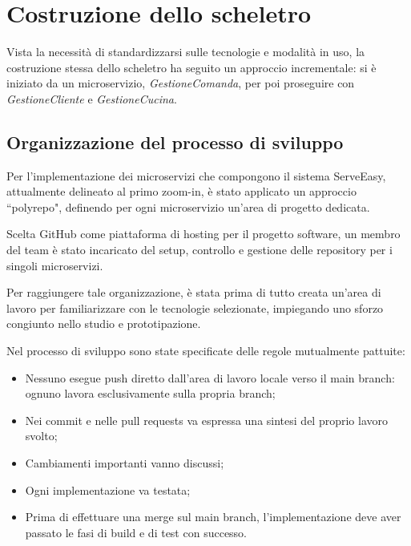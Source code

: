 \section{Costruzione dello scheletro}
Vista la necessità di standardizzarsi sulle tecnologie e modalità in uso, la costruzione stessa dello scheletro 
ha seguito un approccio incrementale: si è iniziato da un microservizio, \textit{GestioneComanda}, per poi proseguire con \textit{GestioneCliente} e \textit{GestioneCucina}.

\subsection{Organizzazione del processo di sviluppo}
Per l’implementazione dei microservizi che compongono il sistema ServeEasy, attualmente delineato al primo zoom-in, è stato applicato un approccio “polyrepo"\cite{polyrepo}, definendo per ogni microservizio un’area di progetto dedicata. 

Scelta GitHub come piattaforma di hosting per il progetto software, un membro del team è stato incaricato del setup, controllo e gestione delle repository per i singoli microservizi.

Per raggiungere tale organizzazione, è stata prima di tutto creata un’area di lavoro per familiarizzare con le tecnologie selezionate, impiegando uno sforzo congiunto nello studio e prototipazione.

Nel processo di sviluppo sono state specificate delle regole mutualmente pattuite:
\begin{itemize}
    \item Nessuno esegue push diretto dall’area di lavoro locale verso il main branch: ognuno lavora esclusivamente sulla propria branch;
    \item Nei commit e nelle pull requests va espressa una sintesi del proprio lavoro svolto;
\item Cambiamenti importanti vanno discussi;
\item Ogni implementazione va testata;
\item Prima di effettuare una merge sul main branch, l’implementazione deve aver passato le fasi di build e di test con successo.
\end{itemize}

